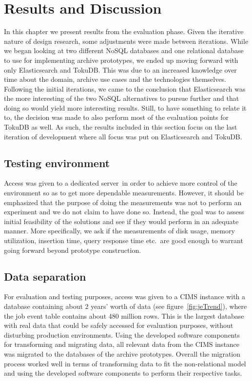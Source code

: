 \chapter{Results and Discussion}
\label{chap:results}

In this chapter we present results from the evaluation phase. Given the iterative nature of design research, some adjustments were made between iterations. While we began looking at two different NoSQL databases and one relational database to use for implementing archive prototypes, we ended up moving forward with only Elasticsearch and TokuDB. This was due to an increased knowledge over time about the domain, archive use cases and the technologies themselves. Following the initial iterations, we came to the conclusion that Elasticsearch was the more interesting of the two NoSQL alternatives to pursue further and that doing so would yield more interesting results. Still, to have something to relate it to, the decision was made to also perform most of the evaluation points for TokuDB as well.
As such, the results included in this section focus on the last iteration of development where all focus was put on Elasticsearch and TokuDB. 

\section{Testing environment}
Access was given to a dedicated server\footnotemark\ in order to achieve more control of the environment so as to get more dependable measurements. However, it should be emphasized that the purpose of doing the measurements was not to perform an experiment and we do not claim to have done so. Instead, the goal was to assess initial feasibility of the solutions and see if they would perform in an adequate manner. More specifically, we ask if the measurements of disk usage, memory utilization, insertion time, query response time etc.\ are good enough to warrant going forward beyond prototype construction.


\section{Data separation}
For evaluation and testing purposes, access was given to a CIMS instance with a database containing about 2 years' worth of data (see figure~\ref{fig:jeTrend}), where the job event table contains about 480 million rows. This is the largest database with real data that could be safely accessed for evaluation purposes, without disturbing production environments. Using the developed software components for transforming and migrating data, all relevant data from the CIMS instance was migrated to the databases of the archive prototypes. Overall the migration process worked well in terms of transforming data to fit the non-relational model and using the developed software components to perform their respective tasks.

